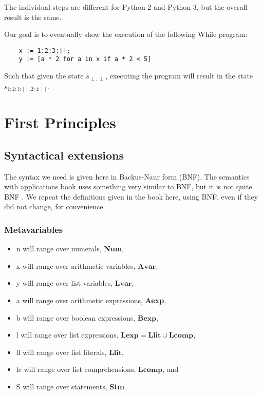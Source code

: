 \documentclass[12pt]{article}
\newcommand{\metavar}[1]{\textlangle#1\textrangle}
\newcommand{\Avar}{\mathbf{Avar}}
\newcommand{\Lvar}{\mathbf{Lvar}}
\newcommand{\Bexp}{\mathbf{Bexp}}
\newcommand{\Lexp}{\mathbf{Lexp}}
\newcommand{\Llit}{\mathbf{Llit}}
\newcommand{\Lcomp}{\mathbf{Lcomp}}
\begin{document}
The individual steps are different for Python 2 and Python 3, but the overall result is the same.

Our goal is to eventually show the execution of the following While program:

\begin{lstlisting}
    x := 1:2:3:[];
    y := [a * 2 for a in x if a * 2 < 5]
\end{lstlisting}

Such that given the state $s_{\perp, \perp}$, executing the program will result in the state $s_{1:2:3:[], 2:4:[]}$.

\section{First Principles}

\subsection{Syntactical extensions}

The syntax we need is given here in Backus-Naur form (BNF). The semantics with applications book uses something very similar to BNF, but it is not quite BNF \cite[section 1.2]{wiley}. We repeat the definitions given in the book here, using BNF, even if they did not change, for convenience.

\subsubsection{Metavariables}

\begin{itemize}
    \item \metavar{n} will range over numerals, \textbf{Num},
    \item \metavar{x} will range over arithmetic variables, $\Avar$,
    \item \metavar{y} will range over list variables, $\Lvar$,
    \item \metavar{a} will range over arithmetic expressions, \textbf{Aexp},
    \item \metavar{b} will range over boolean expressions, $\Bexp$,
    \item \metavar{l} will range over list expressions, $\Lexp = \Llit \cup \Lcomp$,
    \item \metavar{ll} will range over list literals, $\Llit$,
    \item \metavar{lc} will range over list comprehensions, $\Lcomp$, and
    \item \metavar{S} will range over statements, \textbf{Stm}.
\end{itemize}
\end{document}
